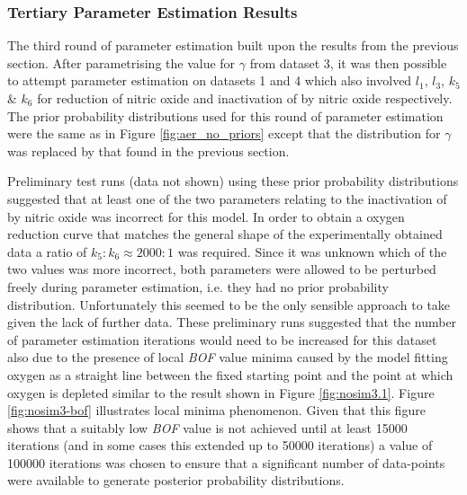 \subsubsection{Tertiary Parameter Estimation Results}
The third round of parameter estimation built upon the results from the previous section. After parametrising the value for $\gamma$ from dataset 3, it was then possible to attempt parameter estimation on datasets 1 and 4 which also involved $l_1$, $l_3$, $k_5$ \& $k_6$ for reduction of nitric oxide and inactivation of \cbbthree{} by nitric oxide respectively. The prior probability distributions used for this round of parameter estimation were the same as in Figure \ref{fig:aer_no_priors} except that the distribution for $\gamma$ was replaced by that found in the previous section.

Preliminary test runs (data not shown) using these prior probability distributions suggested that at least one of the two parameters relating to the inactivation of \cbbthree{} by nitric oxide was incorrect for this model. In order to obtain a oxygen reduction curve that matches the general shape of the experimentally obtained data a ratio of $k_5:k_6 \approx 2000:1$ was required. Since it was unknown which of the two values was more incorrect, both parameters were allowed to be perturbed freely during parameter estimation, i.e. they had no prior probability distribution. Unfortunately this seemed to be the only sensible approach to take given the lack of further data. These preliminary runs suggested that the number of parameter estimation iterations would need to be increased for this dataset also due to the presence of local \textit{BOF} value minima caused by the model fitting oxygen as a straight line between the fixed starting point and the point at which oxygen is depleted similar to the result shown 
in Figure \ref{fig:nosim3.1}. Figure \ref{fig:nosim3-bof} illustrates local minima phenomenon. Given that this figure shows that a suitably low \textit{BOF} value is not achieved until at least 15000 iterations (and in some cases this extended up to 50000 iterations) a value of 100000 iterations was chosen to ensure that a significant number of data-points were available to generate posterior probability distributions.


